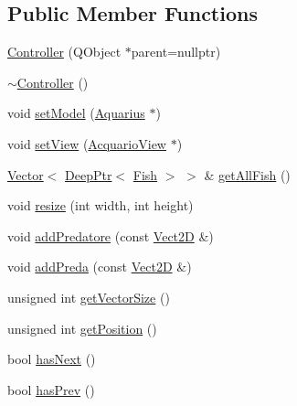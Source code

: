 \subsection*{Public Member Functions}
\begin{DoxyCompactItemize}
\item 
\hyperlink{classController_af888a35f7a377692726d81332edf08ab_af888a35f7a377692726d81332edf08ab}{Controller} (Q\+Object $\ast$parent=nullptr)
\item 
\hyperlink{classController_a0ab87934c4f7a266cfdb86e0f36bc1b5_a0ab87934c4f7a266cfdb86e0f36bc1b5}{$\sim$\+Controller} ()
\item 
void \hyperlink{classController_a7506d17de939f6a84d3c057a55cf9272_a7506d17de939f6a84d3c057a55cf9272}{set\+Model} (\hyperlink{classAquarius}{Aquarius} $\ast$)
\item 
void \hyperlink{classController_a41aedc9fb5b715434c46097906aed910_a41aedc9fb5b715434c46097906aed910}{set\+View} (\hyperlink{classAcquarioView}{Acquario\+View} $\ast$)
\item 
\hyperlink{classVector}{Vector}$<$ \hyperlink{classDeepPtr}{Deep\+Ptr}$<$ \hyperlink{classFish}{Fish} $>$ $>$ \& \hyperlink{classController_aff25249a2b638e88e44d3c85c80f7ad6_aff25249a2b638e88e44d3c85c80f7ad6}{get\+All\+Fish} ()
\item 
void \hyperlink{classController_a9c71f8356f16cafffe3a878a58bd43e8_a9c71f8356f16cafffe3a878a58bd43e8}{resize} (int width, int height)
\item 
void \hyperlink{classController_a38346ab691e6d83dec69c3d60839d414_a38346ab691e6d83dec69c3d60839d414}{add\+Predatore} (const \hyperlink{classVect2D}{Vect2D} \&)
\item 
void \hyperlink{classController_ad1cbf75efaef06838c322c0d11deb473_ad1cbf75efaef06838c322c0d11deb473}{add\+Preda} (const \hyperlink{classVect2D}{Vect2D} \&)
\item 
unsigned int \hyperlink{classController_a3d9e63417c55b627ac7d79017f672617_a3d9e63417c55b627ac7d79017f672617}{get\+Vector\+Size} ()
\item 
unsigned int \hyperlink{classController_ade92370baade9b789d4b47e75c830076_ade92370baade9b789d4b47e75c830076}{get\+Position} ()
\item 
bool \hyperlink{classController_a2c4171f922bf604da9b1db2f9b2b4d15_a2c4171f922bf604da9b1db2f9b2b4d15}{has\+Next} ()
\item 
bool \hyperlink{classController_ab052ce96b259dc18a6b61506e678ca65_ab052ce96b259dc18a6b61506e678ca65}{has\+Prev} ()
\item 

\end{DoxyCompactItemize}
